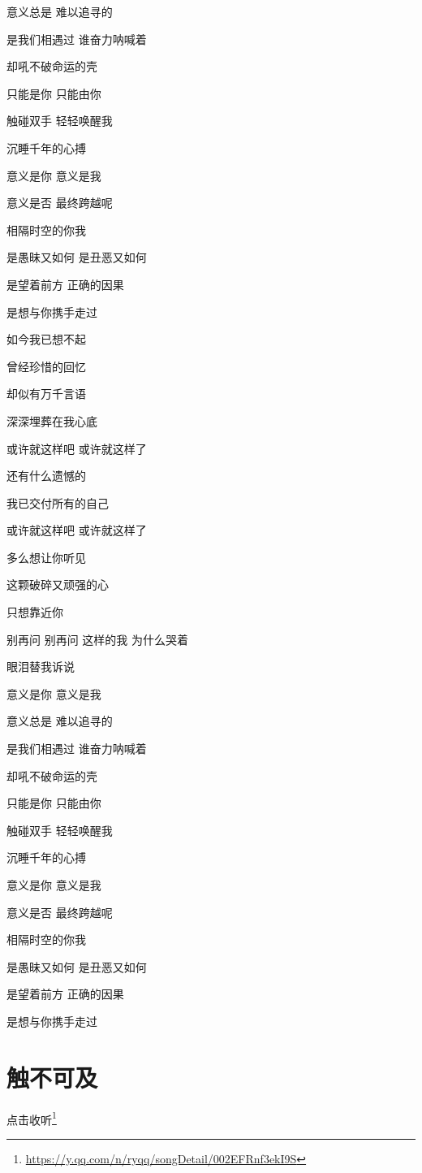\documentclass[]{ctexbook}
\renewcommand{\href}[2]{#2\footnote{\url{#1}}}
\begin{document}
意义总是 难以追寻的

是我们相遇过 谁奋力呐喊着

却吼不破命运的壳

只能是你 只能由你

触碰双手 轻轻唤醒我

沉睡千年的心搏

意义是你 意义是我

意义是否 最终跨越呢

相隔时空的你我

是愚昧又如何 是丑恶又如何

是望着前方 正确的因果

是想与你携手走过

如今我已想不起

曾经珍惜的回忆

却似有万千言语

深深埋葬在我心底

或许就这样吧 或许就这样了

还有什么遗憾的

我已交付所有的自己

或许就这样吧 或许就这样了

多么想让你听见

这颗破碎又顽强的心

只想靠近你

别再问 别再问 这样的我 为什么哭着

眼泪替我诉说

意义是你 意义是我

意义总是 难以追寻的

是我们相遇过 谁奋力呐喊着

却吼不破命运的壳

只能是你 只能由你

触碰双手 轻轻唤醒我

沉睡千年的心搏

意义是你 意义是我

意义是否 最终跨越呢

相隔时空的你我

是愚昧又如何 是丑恶又如何

是望着前方 正确的因果

是想与你携手走过

\section*{触不可及}\label{untouchable}


\href{https://y.qq.com/n/ryqq/songDetail/002EFRnf3ekI9S}{点击收听}
\end{document}

